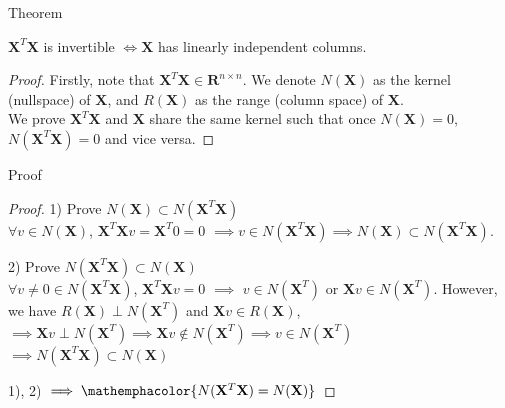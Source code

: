 \documentclass{beamer}
\begin{document}
\begin{frame}{Theorem}
    \begin{theorem}
        $\mathbf{X}^T\mathbf{X}$ is invertible $\iff \mathbf{X}$ has linearly independent columns.
    \end{theorem}\pause
    \vspace{0.2in}
    \begin{proof}
        Firstly, note that $\mathbf{X}^T\mathbf{X} \in \mathbf{R}^{n \times n}$. We denote $N(\mathbf{X})$ as the kernel (nullspace) of $\mathbf{X}$, and $R(\mathbf{X})$ as the range (column space) of $\mathbf{X}$. \\
        We prove $\mathbf{X}^T\mathbf{X}$ and $\mathbf{X}$ share the same kernel such that once $N(\mathbf{X}) = 0$, $N(\mathbf{X}^T\mathbf{X}) = 0$ and vice versa.
    \end{proof}
\end{frame}

\begin{frame}{Proof}
    \begin{proof}
        1) Prove $N(\mathbf{X}) \subset N(\mathbf{X}^T\mathbf{X})$ \\
        $\forall v \in N(\mathbf{X})$, $\mathbf{X}^T\mathbf{X}v = \mathbf{X}^T0 = 0$ $\implies v \in N(\mathbf{X}^T\mathbf{X}) \implies N(\mathbf{X}) \subset N(\mathbf{X}^T\mathbf{X})$. \\ \pause
        
        \vspace{0.2in}
        2) Prove $N(\mathbf{X}^T\mathbf{X}) \subset N(\mathbf{X})$ \\
        $\forall v\neq 0 \in N(\mathbf{X}^T\mathbf{X})$, $\mathbf{X}^T\mathbf{X}v = 0$ $\implies$ $v \in N(\mathbf{X}^T)$ or $\mathbf{X}v \in N(\mathbf{X}^T)$. However, we have $R(\mathbf{X}) \perp N(\mathbf{X}^T)$ and $\mathbf{X}v \in R(\mathbf{X})$, $\implies \mathbf{X}v \perp N(\mathbf{X}^T) \implies \mathbf{X}v \notin N(\mathbf{X}^T) \implies v \in N(\mathbf{X}^T)$
        $\implies N(\mathbf{X}^T\mathbf{X}) \subset N(\mathbf{X})$ \\ \pause
        
        \vspace{0.2in}
        1), 2) $\implies \mathemphacolor{N(\mathbf{X}^T\mathbf{X}) = N(\mathbf{X})}$
    \end{proof}
\end{frame}

\end{document}
